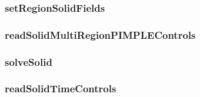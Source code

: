 \subsubsection*{setRegionSolidFields}

\subsubsection*{readSolidMultiRegionPIMPLEControls}

\subsubsection*{solveSolid}

\subsubsection*{readSolidTimeControls}

